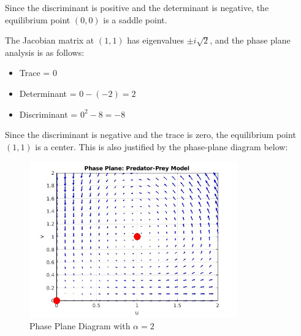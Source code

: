 \documentclass[11pt, letterpaper]{article}
\begin{document}
Since the discriminant is positive and the determinant is negative, the
equilibrium point $(0, 0)$ is a saddle point.

The Jacobian matrix at $(1, 1)$ has eigenvalues $\pm i\sqrt{2}$, and the phase
plane analysis is as follows:
\begin{itemize}
    \item Trace = $0$
    \item Determinant = $0 - (-2) = 2$
    \item Discriminant = $0^2 - 8 = -8$
\end{itemize}

Since the discriminant is negative and the trace is zero, the equilibrium point
$(1, 1)$ is a center. This is also justified by the phase-plane diagram below:
\begin{figure}[H]
    \centering
    \includegraphics[width=0.8\textwidth]{plot.jpg}
    \caption{Phase Plane Diagram with $\alpha=2$}
\end{figure}
\end{document}
